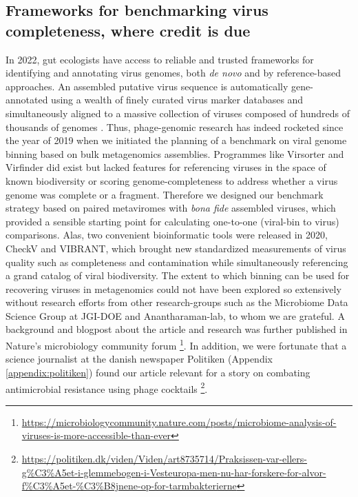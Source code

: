 \subsection{Frameworks for benchmarking virus completeness, where credit is due}

In 2022, gut ecologists have access to reliable and trusted frameworks for identifying and annotating virus genomes, both \textit{de novo} and by reference-based approaches. An assembled putative virus sequence is automatically gene-annotated using a wealth of finely curated virus marker databases and simultaneously aligned to a massive collection of viruses composed of hundreds of thousands of genomes \cite{Nayfach2021-yf}. Thus, phage-genomic research has indeed rocketed since the year of 2019 when we initiated the planning of a benchmark on viral genome binning based on bulk metagenomics assemblies. Programmes like Virsorter and Virfinder did exist but lacked features for referencing viruses in the space of known biodiversity or scoring genome-completeness to address whether a virus genome was complete or a fragment. Therefore we designed our benchmark strategy based on paired metaviromes with \textit{bona fide} assembled viruses, which provided a sensible starting point for calculating one-to-one (viral-bin to virus) comparisons. Alas, two convenient bioinformatic tools were released in 2020, CheckV and VIBRANT, which brought new standardized measurements of virus quality such as completeness and contamination while simultaneously referencing a grand catalog of viral biodiversity. The extent to which binning can be used for recovering viruses in metagenomics could not have been explored so extensively without research efforts from other research-groups such as the Microbiome Data Science Group at JGI-DOE and Anantharaman-lab, to whom we are grateful. A background and blogpost about the article and research was further published in Nature’s microbiology community forum \footnote{\url{https://microbiologycommunity.nature.com/posts/microbiome-analysis-of-viruses-is-more-accessible-than-ever}}. In addition, we were fortunate that a science journalist at the danish newspaper Politiken (Appendix \ref{appendix:politiken}) found our article relevant for a story on combating antimicrobial resistance using phage cocktails \footnote{ \url{https://politiken.dk/viden/Viden/art8735714/Praksissen-var-ellers-g\%C3\%A5et-i-glemmebogen-i-Vesteuropa-men-nu-har-forskere-for-alvor-f\%C3\%A5et-\%C3\%B8jnene-op-for-tarmbakterierne}}.\\ 

